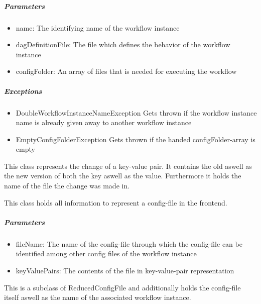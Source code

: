 \subparagraph{Parameters}
\begin{itemize}
	\item{name:}
	The identifying name of the workflow instance
	\item{dagDefinitionFile:}
	The file which defines the behavior of the workflow instance
	\item{configFolder:}
	An array of files that is needed for executing the workflow
\end{itemize}

\subparagraph{Exceptions}
\begin{itemize}
	\item{DoubleWorkflowInstanceNameException}
	Gets thrown if the workflow instance name is already given away to another workflow instance
	\item{EmptyConfigFolderException}
	Gets thrown if the handed configFolder-array is empty
\end{itemize}


This class represents the change of a key-value pair. It contains the old aswell as the new version of both the key aswell as the value. Furthermore it holds the name of the file the change was made in.
\constructor



This class holds all information to represent a config-file in the frontend.
\constructor


\subparagraph{Parameters}
\begin{itemize}
	\item{fileName:}
	The name of the config-file through which the config-file can be identified among other config files of the workflow instance
	\item{keyValuePairs:}
	The contents of the file in key-value-pair representation
\end{itemize}


This is a subclass of ReducedConfigFile and additionally holds the config-file itself aswell as the name of the associated workflow instance.
\constructor

